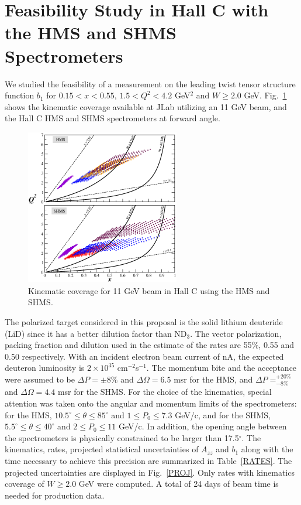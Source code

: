 \appendix

\section{Feasibility Study in Hall C with the HMS and SHMS Spectrometers}

We studied the feasibility of a measurement on the leading twist tensor structure 
function $b_1$ for $0.15<x<0.55$, $1.5<Q^2<4.2$ GeV$^2$ and $W \ge 2.0$ GeV. Fig.~\ref{kincov} 
shows the kinematic coverage available at JLab utilizing an 11 GeV beam, and the Hall C HMS 
and SHMS spectrometers at forward angle. 

\begin{figure}[h]
\begin{center}
\includegraphics[width=0.6\textwidth]{figs/hallc/cov_split.eps}
\caption{\label{kincov} Kinematic coverage for 11 GeV beam in Hall C using the HMS and SHMS.}
\end{center}
\end{figure}

The polarized target considered in this proposal is the solid lithium deuteride (LiD) 
since it has a better dilution factor than ND$_3$. The vector polarization, packing fraction and 
dilution used in the estimate of the rates are 55\%, 0.55 and 0.50 respectively. With an incident 
electron beam current of \CURRENT nA, the 
expected deuteron luminosity is $2\times 10^{35}$ cm$^{-2}$s$^{-1}$. The momentum bite and the acceptance 
were assumed to be $\Delta P = \pm 8\%$ and $\Delta\Omega = 6.5$ msr for the HMS, and $\Delta P 
= ^{+20\%}_{-8\%}$ and $\Delta\Omega =4.4$ msr for the SHMS. For the choice of the kinematics, 
special attention was taken onto the angular and momentum limits of the spectrometers: for the 
HMS, $10.5^{\circ} \le \theta \le 85^{\circ}$ and $1 \le P_0 \le 7.3$ GeV/c, and for the SHMS, 
$5.5^{\circ} \le \theta \le 40^{\circ}$ and $2 \le P_0 \le 11$ GeV/c. In addition, the 
opening angle between the spectrometers is physically constrained to be larger than 17.5$^{\circ}$. 
The kinematics, rates, projected 
statistical uncertainties of $A_{zz}$ and $b_1$ along with the time necessary to achieve this
precision are summarized in Table~\ref{RATES}. The projected uncertainties are displayed in 
Fig.~\ref{PROJ}. Only rates with kinematics coverage of $W \ge 2.0$ GeV were computed. A 
total of 24 days of beam time is needed for production data.

